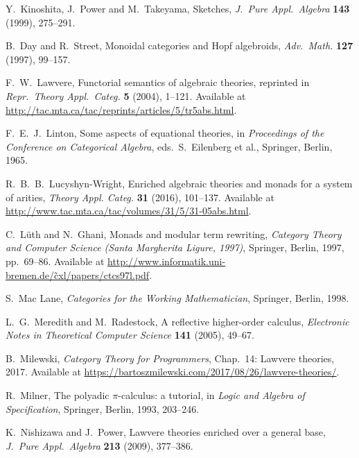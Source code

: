\documentclass{amsart}
\theoremstyle{definition}
\begin{document}
\begin{thebibliography}{100}
 Y.\ Kinoshita, J.\ Power and M.\ Takeyama, Sketches,
\textsl{J.\ Pure Appl.\ Algebra} \textbf{143} (1999), 275--291.

 B.\ Day and R.\ Street, Monoidal categories and Hopf algebroids,
\textsl{Adv.\ Math.} \textbf{127} (1997), 99--157.

 F.\ W.\ Lawvere, Functorial semantics of algebraic theories, reprinted in
\textsl{Repr.\ Theory Appl.\ Categ.} \textbf{5} (2004), 1--121.  Available at \href{http://tac.mta.ca/tac/reprints/articles/5/tr5abs.html}{http://tac.mta.ca/tac/reprints/articles/5/tr5abs.html}.

 F.\ E.\ J.\ Linton, Some aspects of equational theories, in 
\textsl{Proceedings of the Conference on Categorical Algebra}, eds.\ S.\ Eilenberg et al.,
Springer, Berlin, 1965.

 R.\ B.\ B.\ Lucyshyn-Wright, Enriched algebraic theories and monads for a system of arities, \textsl{Theory Appl. Categ.} \textbf{31} (2016), 101--137.  Available at \href{http://www.tac.mta.ca/tac/volumes/31/5/31-05abs.html}{http://www.tac.mta.ca/tac/volumes/31/5/31-05abs.html}.
	
 C.\ L\"{u}th and N.\ Ghani, Monads and modular term rewriting,
\textsl{Category Theory and Computer Science ({S}anta {M}argherita Ligure, 1997)}, Springer, Berlin, 1997, pp.\ 69--86.  Available at \href{http://www.informatik.uni-bremen.de/~cxl/papers/ctcs97l.pdf}{http://www.informatik.uni-bremen.de/\~cxl/papers/ctcs97l.pdf}.

 S.\ Mac Lane, \textsl{Categories for the Working Mathematician}, Springer, Berlin, 1998.  

 L.\ G.\ Meredith and M.\ Radestock, A reflective higher-order calculus,
\textsl{Electronic Notes in Theoretical Computer Science} \textbf{141} (2005), 49--67.

 B.\ Milewski, \textsl{Category Theory for Programmers}, Chap.\ 14: Lawvere theories, 2017.   Available at \href{https://bartoszmilewskiski.com/2017/08/26/lawvere-theories/}{https://bartoszmilewski.com/2017/08/26/lawvere-theories/}.

 R.\ Milner, The polyadic {$\pi$}-calculus: a tutorial, in \textsl{Logic and Algebra of Specification}, Springer, Berlin, 1993, 203--246.

 K.\ Nishizawa and J.\ Power, Lawvere theories enriched over a general base, \textsl{J.\ Pure Appl.\ Algebra}  \textbf{213} (2009), 377--386.


\end{thebibliography}
\end{document}
